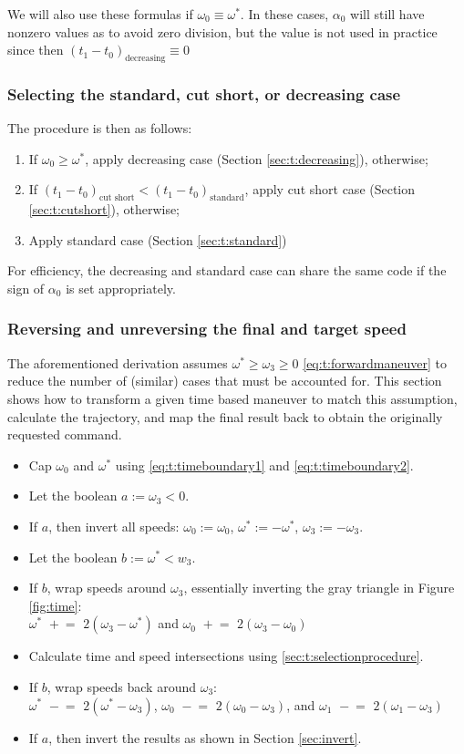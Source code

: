 \documentclass[12pt, a4paper]
{article}
\providecommand{\lr}[1]{\left(#1\right)}
\providecommand{\sub}[1]{_{\text{#1}}}
\providecommand{\w}{\omega}
\providecommand{\wt}{\w^*}
\renewcommand{\a}{\alpha}
\providecommand{\inlineadd}{\,\,+\!\!=\,\,}
\providecommand{\inlinesubtract}{\,\,-\!\!=\,\,}
\begin{document}
We will also use these formulas if $\w_0 \equiv \wt$. In these cases, $\a_0$
will still have nonzero values as to avoid zero division, but the value is not
used in practice since then $\lr{t_1 - t_0}\sub{decreasing}\equiv0$

\subsubsection{Selecting the standard, cut short, or decreasing case}
\label{sec:t:selectionprocedure}
The procedure is then as follows:
% 
\begin{enumerate}
    \item If $\w_0 \geq \wt$, apply decreasing case (Section
    \ref{sec:t:decreasing}), otherwise;
    \item If $\lr{t_1 - t_0}\sub{cut short} < \lr{t_1 - t_0}\sub{standard}$,
    apply cut short case (Section \ref{sec:t:cutshort}), otherwise;
    \item Apply standard case (Section \ref{sec:t:standard})
\end{enumerate}
%
For efficiency, the decreasing and standard case can share the same code if the
sign of $\a_0$ is set appropriately.

\subsubsection{Reversing and unreversing the final and target speed}
\label{sec:t:reversing}
The aforementioned derivation assumes $\wt \geq \w_3 \geq 0$
\eqref{eq:t:forwardmaneuver} to reduce the number of (similar) cases that must
be accounted for. This section shows how to transform a given time based
maneuver to match this assumption, calculate the trajectory, and map the final
result back to obtain the originally requested command.

\begin{itemize}
    \item Cap $\w_0$ and $\wt$ using \eqref{eq:t:timeboundary1} and
        \eqref{eq:t:timeboundary2}.
    \item Let the boolean $a := \w_3 < 0$.
    \item If $a$, then invert all speeds: $\w_0 := \w_0$, $\wt := -\wt$,
        $\w_3 := -\w_3$.
    \item Let the boolean $b := \wt < w_3$.
    \item If $b$, wrap speeds around $\w_3$, essentially inverting the gray
    triangle in Figure \ref{fig:time}:\\
        $\wt \inlineadd 2 (\w_3 - \wt)$ and $\w_0 \inlineadd 2 (\w_3 - \w_0)$
    \item Calculate time and speed intersections using
    \eqref{sec:t:selectionprocedure}.
    \item If $b$, wrap speeds back around $\w_3$:\\
        $\wt \inlinesubtract 2 (\wt-\w_3)$,
        $\w_0 \inlinesubtract 2 (\w_0-\w_3)$, and
        $\w_1 \inlinesubtract 2 (\w_1-\w_3)$
    \item If $a$, then invert the results as shown in Section \ref{sec:invert}.
\end{itemize}
\end{document}
